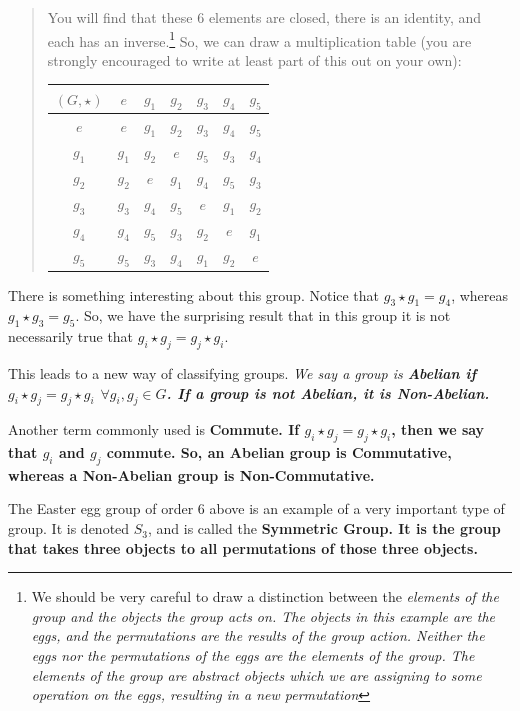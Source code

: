 \documentclass[12pt,epsf]{article}
\begin{document}
\begin{quote}
You will find that these 6 elements are closed, there is an identity,
and each has an inverse.\footnote{We should be very careful to draw a distinction
between the \it elements \rm of the group and the \it objects \rm the group acts on.  
The objects in this example are the eggs, and the permutations are the results of 
the group action.  Neither the eggs nor the permutations of the eggs are the elements
of the group.  The elements of the group are abstract objects which we are assigning 
to some operation on the eggs, resulting in a new permutation}
So, we can draw a multiplication table (you
are strongly encouraged to write at least part of this out on your
own):
\begin{table}[h]
\centering
\begin{tabular}{|c||c|c|c|c|c|c|}
\hline
$(G,\star)$ & $e$ & $g_1$ & $g_2$ & $g_3$ & $g_4$ & $g_5$ \\
\hline
$e$ & $e$ & $g_1$ & $g_2$ & $g_3$ & $g_4$ & $g_5$ \\
\hline
$g_1$ & $g_1$ & $g_2$ & $e$ & $g_5$ & $g_3$ & $g_4$ \\
\hline
$g_2$ & $g_2$ & $e$ & $g_1$ & $g_4$ & $g_5$ & $g_3$ \\
\hline
$g_3$ & $g_3$ & $g_4$ & $g_5$ & $e$ & $g_1$ & $g_2$ \\
\hline
$g_4$ & $g_4$ & $g_5$ & $g_3$ & $g_2$ & $e$ & $g_1$ \\
\hline
$g_5$ & $g_5$ & $g_3$ & $g_4$ & $g_1$ & $g_2$ & $e$ \\
\hline
\end{tabular} \label{s3}
\end{table}

\end{quote}

There is something interesting about this group.  Notice that $g_3
\star g_1 = g_4$, whereas $g_1 \star g_3 = g_5$.  So, we have the
surprising result that in this group it is not necessarily true that
$g_i\star g_j = g_j \star g_i$.  

This leads to a new way of classifying groups.	\it We say a group is
\bf Abelian \it if $g_i \star g_j = g_j \star g_i$ $\forall g_i,g_j \in
G$\rm.	If a group is not Abelian, it is \bf Non-Abelian\rm.  

Another term commonly used is \bf Commute\rm.  If $g_i\star g_j = g_j
\star g_i$, then we say that $g_i$ and $g_j$ commute.  So, an Abelian
group is \bf Commutative\rm, whereas a Non-Abelian group is \bf
Non-Commutative\rm.  

The Easter egg group of order 6 above is an example of a very important
type of group.	It is denoted $S_3$, and is called the \bf Symmetric
Group\rm.  It is the group that takes three objects to all permutations of
those three objects.  
\end{document}
